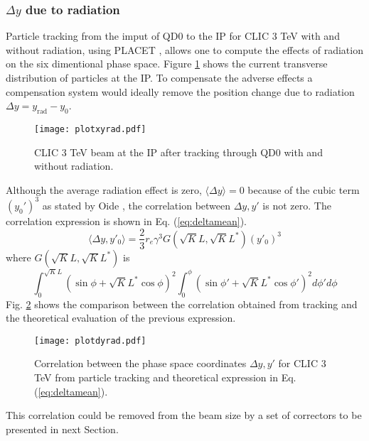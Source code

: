 \subsubsection{$\Delta y$ due to radiation}
Particle tracking from the imput of QD0 to the IP for CLIC 3 TeV with and without radiation, using PLACET \cite{Placet}, allows one to compute the effects of radiation on the six dimentional phase space. Figure \ref{f:CLIC3TeVbeamsizeIP} shows the current transverse distribution of particles at the IP. To compensate the adverse effects a compensation system would ideally remove the position change due to radiation $\Delta y = y_\text{rad} -y_0$.\par
\begin{figure}[!htb]
\centering
 \texttt{[image: plotxyrad.pdf]}\caption{CLIC 3 TeV beam at the IP after tracking through 	QD0 with and without radiation.}\label{f:CLIC3TeVbeamsizeIP}
\end{figure}
Although the average radiation effect is zero, $\langle \Delta y \rangle = 0$ because of the cubic term $(y_0')^3$ as stated by Oide \cite{Oide}, the correlation between $\Delta y, y'$ is not zero. The correlation expression is shown in Eq. (\ref{eq:deltamean}).
\begin{equation}
 \langle\Delta y,y'_0\rangle = \frac{2}{3}r_e\gamma^3G(\sqrt{K}L,\sqrt{K}L^*)(y'_0)^3\label{eq:deltamean}
\end{equation}
where $G(\sqrt{K}L,\sqrt{K}L^*)$ is
\begin{equation}
\int_0^{\sqrt{K}L}(\sin\phi+\sqrt{K}L^*\cos\phi)^2\int_0^\phi (\sin\phi'+\sqrt{K}L^*\cos\phi')^2 d\phi'd\phi
\end{equation}
Fig. \ref{f:correlation} shows the comparison between the correlation obtained from tracking and the theoretical evaluation of the previous expression.\par
\begin{figure}[!htb]
\centering
\texttt{[image: plotdyrad.pdf]}\caption{Correlation between the phase space coordinates $\Delta y,y'$ for CLIC 3 TeV from particle tracking and theoretical expression in Eq. (\ref{eq:deltamean}).}\label{f:correlation}
\end{figure}
This correlation could be removed from the beam size by a set of correctors to be presented in next Section.

